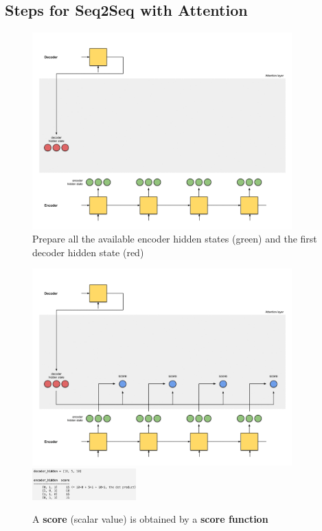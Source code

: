 \documentclass[11pt]{article}
\begin{document}
\subsection{Steps for Seq2Seq with Attention}

\begin{figure}[H]
	\centering
	\includegraphics[width=10cm]{seq2seq_attention_preparation}
	\caption{Prepare all the available encoder hidden states (green) and the first decoder hidden state (red)}
\end{figure}
\begin{figure}[H]
	\centering
	\includegraphics[width=10cm]{seq2seq_attention_score}
	\includegraphics[width=4cm]{img/seq2seq_attention_scores}
	\caption{A \textbf{score} (scalar value) is obtained by a \textbf{score function}}
\end{figure}
\end{document}

